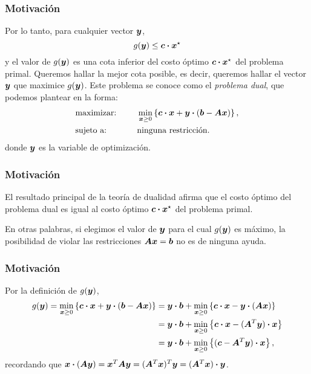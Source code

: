 \documentclass[aspectratio=169,12pt,spanish]{beamer}
\begin{document}

\begin{frame}
\frametitle{Motivación}

Por lo tanto, para cualquier vector $\bm{y}$,
$$g(\bm{y}) \le \bm{c} \boldsymbol{\cdot} \bm{x}^\star$$
y el valor de $g(\bm{y})$ es una cota inferior del costo óptimo $\bm{c} \boldsymbol{\cdot} \bm{x}^\star$ del problema primal. Queremos hallar la mejor cota posible, es decir, queremos hallar el vector $\bm{y}$ que maximice $g(\bm{y})$. Este problema se conoce como el \emph{problema dual}, que podemos plantear en la forma:
\begin{alignat*}{2}
  & \text{maximizar: } & & \min_{\bm{x} \ge 0} \left\{ \bm{c} \boldsymbol{\cdot} \bm{x} + \bm{y} \boldsymbol{\cdot} (\bm{b}-\bm{A}\bm{x})\right\}, \\
   & \text{sujeto a: } & \quad & \text{ninguna restricción}.
\end{alignat*}
donde $\bm{y}$ es la variable de optimización.

\end{frame}


\begin{frame}
\frametitle{Motivación}

El resultado principal de la teoría de dualidad afirma que el costo óptimo del problema dual es igual al costo óptimo $\bm{c} \boldsymbol{\cdot} \bm{x}^\star$ del problema primal.

En otras palabras, si elegimos el valor de $\bm{y}$ para el cual $g(\bm{y})$ es máximo, la posibilidad de violar las restricciones $ \bm{A}\bm{x} = \bm{b}$ no es de ninguna ayuda.


\end{frame}


\begin{frame}
\frametitle{Motivación}

Por la definición de $g(\bm{y})$,
$$
\begin{aligned}
g(\bm{y}) = \min_{\bm{x} \ge 0} \left\{ \bm{c} \boldsymbol{\cdot} \bm{x} + \bm{y} \boldsymbol{\cdot} (\bm{b}-\bm{A}\bm{x})\right\}
&= \bm{y} \boldsymbol{\cdot} \bm{b} + \min_{\bm{x} \ge 0} \left\{ \bm{c} \boldsymbol{\cdot} \bm{x} - \bm{y} \boldsymbol{\cdot} (\bm{A}\bm{x}) \right\} \\
&= \bm{y} \boldsymbol{\cdot} \bm{b} + \min_{\bm{x} \ge 0} \left\{ \bm{c} \boldsymbol{\cdot} \bm{x} - (\bm{A}^T\bm{y}) \boldsymbol{\cdot} \bm{x} \right\} \\
&= \bm{y} \boldsymbol{\cdot} \bm{b} + \min_{\bm{x} \ge 0} \left\{ (\bm{c} - \bm{A}^T\bm{y}) \boldsymbol{\cdot} \bm{x} \right\},
\end{aligned}
$$
recordando que $\bm{x} \boldsymbol{\cdot} (\bm{A}\bm{y}) = \bm{x}^T \bm{A} \bm{y} = (\bm{A}^T \bm{x})^T \bm{y} = (\bm{A}^T \bm{x}) \boldsymbol{\cdot} \bm{y}$.


\end{frame}
\end{document}
